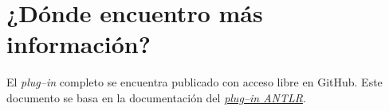 \documentclass[a5paper,10pt]{article}
\begin{document}



\section{¿Dónde encuentro más información?}
\label{pagina}

El \emph{plug--in} completo se encuentra publicado con acceso libre en GitHub.  Este documento se basa en la documentación del \href{https://github.com/mike-lischke/vscode-antlr4/tree/master/doc}{\emph{plug--in ANTLR}}.
\end{document}
